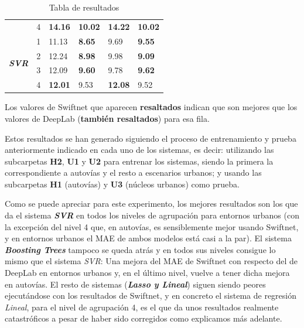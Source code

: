 \begin{table}[H]
{\begin{tabular}{|l|l|l|l|l|l|}
 & 4 & \textbf{14.16} & \textbf{10.02} & \textbf{14.22} & \textbf{10.02}\\ \cline{1-6}
\multirow{4}{*}{\textbf{\textit{SVR}}} & 1 & 11.13 & \textbf{8.65} & 9.69 & \textbf{9.55} \\ \cline{2-6}
 & 2 & 12.24 & \textbf{8.98} & 9.98 & \textbf{9.09}\\ \cline{2-6}
 & 3 & 12.09 & \textbf{9.60} & 9.78 & \textbf{9.62}\\ \cline{2-6} 
 & 4 & \textbf{12.01} & 9.53 & \textbf{12.08} & 9.52\\ \cline{1-6}
\end{tabular}
}
\caption{Tabla de resultados} %
\label{tab:Resul_ISA2}
\end{table}

Los valores de Swiftnet que aparecen \textbf{resaltados} indican que son mejores que los valores de DeepLab (\textbf{también resaltados}) para esa fila.

Estos resultados se han generado siguiendo el proceso de entrenamiento y prueba anteriormente indicado en cada uno de los sistemas, es decir: utilizando las subcarpetas \textbf{H2}, \textbf{U1} y \textbf{U2} para entrenar los sistemas, siendo la primera la correspondiente a autovías y el resto a escenarios urbanos; y usando las subcarpetas \textbf{H1} (autovías) y \textbf{U3} (núcleos urbanos) como prueba.

Como se puede apreciar para este experimento, los mejores resultados son los que da el sistema \textbf{\textit{\ac{SVR}}} en todos los niveles de agrupación para entornos urbanos (con la excepción del nivel 4 que, en autovías, es sensiblemente mejor usando Swiftnet, y en entornos urbanos el \ac{MAE} de ambos modelos está casi a la par). El sistema \textbf{\textit{Boosting Trees}} tampoco se queda atrás y en todos sus niveles consigue lo mismo que el sistema \textit{\ac{SVR}}: Una mejora del \ac{MAE} de Swiftnet con respecto del de DeepLab en entornos urbanos y, en el último nivel, vuelve a tener dicha mejora en autovías. El resto de sistemas (\textbf{\textit{Lasso y Lineal}}) siguen siendo peores ejecutándose con los resultados de Swiftnet, y en concreto el sistema de regresión \textit{Lineal}, para el nivel de agrupación 4, es el que da unos resultados realmente catastróficos a pesar de haber sido corregidos como explicamos más adelante.%

